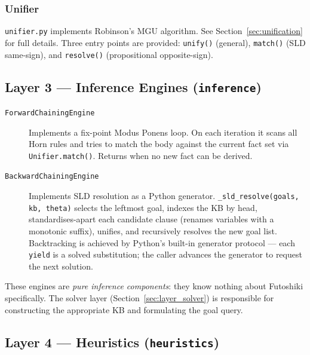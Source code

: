 \subsubsection{Unifier}

\texttt{unifier.py} implements Robinson's MGU algorithm.
See Section~\ref{sec:unification} for full details.
Three entry points are provided: \texttt{unify()} (general),
\texttt{match()} (SLD same-sign), and \texttt{resolve()} (propositional
opposite-sign).

\subsection{Layer 3 — Inference Engines (\texttt{inference})}
\label{sec:layer_inference}

\begin{description}
  \item[\texttt{ForwardChainingEngine}] Implements a fix-point
    Modus Ponens loop.
    On each iteration it scans all Horn rules and tries to match the
    body against the current fact set via \texttt{Unifier.match()}.
    Returns when no new fact can be derived.

  \item[\texttt{BackwardChainingEngine}] Implements SLD resolution as a
    Python generator.
    \texttt{\_sld\_resolve(goals, kb, theta)} selects the leftmost goal,
    indexes the KB by head, standardises-apart each candidate clause
    (renames variables with a monotonic suffix), unifies, and recursively
    resolves the new goal list.
    Backtracking is achieved by Python's built-in generator protocol —
    each \texttt{yield} is a solved substitution; the caller advances the
    generator to request the next solution.
\end{description}

These engines are \emph{pure inference components}: they know nothing about
Futoshiki specifically.
The solver layer (Section~\ref{sec:layer_solver}) is responsible for
constructing the appropriate KB and formulating the goal query.

\subsection{Layer 4 — Heuristics (\texttt{heuristics})}
\label{sec:layer_heuristics}

